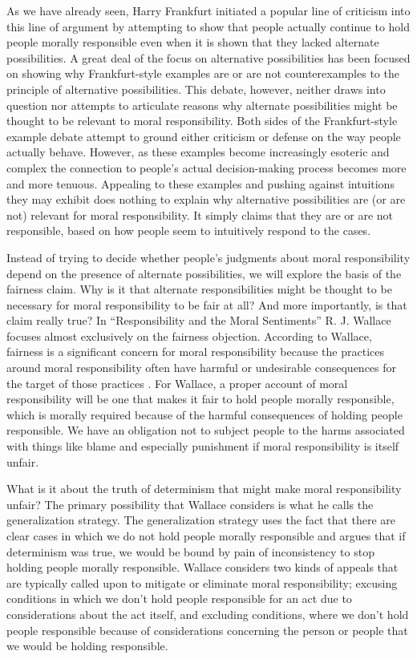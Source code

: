 \documentclass[phd,12pt,oneside,paper=letterpaper]{ubcthesis}
\begin{document}
As we have already seen, Harry Frankfurt initiated a popular line of criticism into this line of argument by attempting to show that people actually continue to hold people morally responsible even when it is shown that they lacked alternate possibilities. \citep{frankfurt1969}A great deal of the focus on alternative possibilities has been focused on showing why Frankfurt-style examples are or are not counterexamples to the principle of alternative possibilities. This debate, however, neither draws into question nor attempts to articulate reasons why alternate possibilities might be thought to be relevant to moral responsibility. Both sides of the Frankfurt-style example debate attempt to ground either criticism or defense on the way people actually behave. However, as these examples become increasingly esoteric and complex the connection to people's actual decision-making process becomes more and more tenuous. Appealing to these examples and pushing against intuitions they may exhibit does nothing to explain why alternative possibilities are (or are not) relevant for moral responsibility. It simply claims that they are or are not responsible, based on how people seem to intuitively respond to the cases. 

Instead of trying to decide whether people's judgments about moral responsibility depend on the presence of alternate possibilities, we will explore the basis of the fairness claim. Why is it that alternate responsibilities might be thought to be necessary for moral responsibility to be fair at all? And more importantly, is that claim really true?
In ``Responsibility and the Moral Sentiments'' R. J. Wallace focuses almost exclusively on the fairness objection. According to Wallace, fairness is a significant concern for moral responsibility because the practices around moral responsibility often have harmful or undesirable consequences for the target of those practices \citep[p.59-61]{wallace1994}. For Wallace, a proper account of moral responsibility will be one that makes it fair to hold people morally responsible, which is morally required because of the harmful consequences of holding people responsible. We have an obligation not to subject people to the harms associated with things like blame and especially punishment if moral responsibility is itself unfair. 

What is it about the truth of determinism that might make moral responsibility unfair? The primary possibility that Wallace considers is what he calls the generalization strategy. The generalization strategy uses the fact that there are clear cases in which we do not hold people morally responsible and argues that if determinism was true, we would be bound by pain of inconsistency to stop holding people morally responsible. Wallace considers two kinds of appeals that are typically called upon to mitigate or eliminate moral responsibility; excusing conditions in which we don't hold people responsible for an act due to considerations about the act itself, and excluding conditions, where we don't hold people responsible because of considerations concerning the person or people that we would be holding responsible. \citep[p.118-194]{wallace1994}
\end{document}
